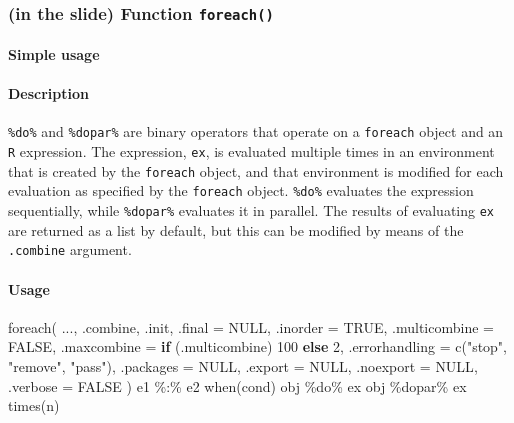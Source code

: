 \documentclass[
]{article}
\newenvironment{Shaded}{}{}
\newcommand{\AttributeTok}[1]{\textcolor[rgb]{0.49,0.56,0.16}{#1}}
\newcommand{\ConstantTok}[1]{\textcolor[rgb]{0.53,0.00,0.00}{#1}}
\newcommand{\ControlFlowTok}[1]{\textcolor[rgb]{0.00,0.44,0.13}{\textbf{#1}}}
\newcommand{\DecValTok}[1]{\textcolor[rgb]{0.25,0.63,0.44}{#1}}
\newcommand{\FunctionTok}[1]{\textcolor[rgb]{0.02,0.16,0.49}{#1}}
\newcommand{\NormalTok}[1]{#1}
\newcommand{\SpecialCharTok}[1]{\textcolor[rgb]{0.25,0.44,0.63}{#1}}
\newcommand{\StringTok}[1]{\textcolor[rgb]{0.25,0.44,0.63}{#1}}
\begin{document}
\hypertarget{in-the-slide-function-foreach}{%
\subsubsection{\texorpdfstring{(in the slide) Function
\texttt{foreach()}}{(in the slide) Function foreach()}}\label{in-the-slide-function-foreach}}

\hypertarget{simple-usage}{%
\paragraph{\texorpdfstring{\textbf{Simple usage}}{Simple usage}}\label{simple-usage}}

\hypertarget{description-3}{%
\paragraph{Description}\label{description-3}}

\texttt{⁠\%do\%⁠} and \texttt{⁠\%dopar\%⁠} are binary operators that operate
on a \texttt{foreach} object and an \texttt{R} expression. The
expression, \texttt{ex}, is evaluated multiple times in an environment
that is created by the \texttt{foreach} object, and that environment is
modified for each evaluation as specified by the \texttt{foreach}
object. \texttt{⁠\%do\%⁠} evaluates the expression sequentially, while
\texttt{⁠\%dopar\%⁠} evaluates it in parallel. The results of evaluating
\texttt{ex} are returned as a list by default, but this can be modified
by means of the \texttt{.combine} argument.

\hypertarget{usage-2}{%
\paragraph{Usage}\label{usage-2}}

\begin{Shaded}
\begin{Highlighting}[]
\FunctionTok{foreach}\NormalTok{(}
\NormalTok{  ...,}
\NormalTok{  .combine,}
\NormalTok{  .init,}
  \AttributeTok{.final =} \ConstantTok{NULL}\NormalTok{,}
  \AttributeTok{.inorder =} \ConstantTok{TRUE}\NormalTok{,}
  \AttributeTok{.multicombine =} \ConstantTok{FALSE}\NormalTok{,}
  \AttributeTok{.maxcombine =} \ControlFlowTok{if}\NormalTok{ (.multicombine) }\DecValTok{100} \ControlFlowTok{else} \DecValTok{2}\NormalTok{,}
  \AttributeTok{.errorhandling =} \FunctionTok{c}\NormalTok{(}\StringTok{"stop"}\NormalTok{, }\StringTok{"remove"}\NormalTok{, }\StringTok{"pass"}\NormalTok{),}
  \AttributeTok{.packages =} \ConstantTok{NULL}\NormalTok{,}
  \AttributeTok{.export =} \ConstantTok{NULL}\NormalTok{,}
  \AttributeTok{.noexport =} \ConstantTok{NULL}\NormalTok{,}
  \AttributeTok{.verbose =} \ConstantTok{FALSE}
\NormalTok{)}
\NormalTok{e1 }\SpecialCharTok{\%:\%}\NormalTok{ e2}
\FunctionTok{when}\NormalTok{(cond)}
\NormalTok{obj }\SpecialCharTok{\%do\%}\NormalTok{ ex}
\NormalTok{obj }\SpecialCharTok{\%dopar\%}\NormalTok{ ex}
\FunctionTok{times}\NormalTok{(n)}
\end{Highlighting}
\end{Shaded}
\end{document}
